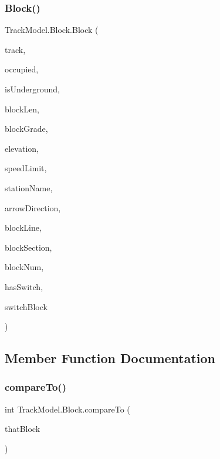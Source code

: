 \subsubsection{\texorpdfstring{Block()}{Block()}}
{\footnotesize\ttfamily Track\+Model.\+Block.\+Block (\begin{DoxyParamCaption}\item[{\hyperlink{classTrackModel_1_1TrackModel}{Track\+Model}}]{track,  }\item[{Boolean}]{occupied,  }\item[{Boolean}]{is\+Underground,  }\item[{Double}]{block\+Len,  }\item[{Double}]{block\+Grade,  }\item[{Double}]{elevation,  }\item[{Double}]{speed\+Limit,  }\item[{String}]{station\+Name,  }\item[{String}]{arrow\+Direction,  }\item[{String}]{block\+Line,  }\item[{String}]{block\+Section,  }\item[{Integer}]{block\+Num,  }\item[{Boolean}]{has\+Switch,  }\item[{String}]{switch\+Block }\end{DoxyParamCaption})}



\subsection{Member Function Documentation}
\mbox{\label{classTrackModel_1_1Block_a2b940992804680c1146a1fef8f55f7db}} 
\subsubsection{\texorpdfstring{compare\+To()}{compareTo()}}
{\footnotesize\ttfamily int Track\+Model.\+Block.\+compare\+To (\begin{DoxyParamCaption}\item[{\hyperlink{classTrackModel_1_1Block}{Block}}]{that\+Block }\end{DoxyParamCaption})}



